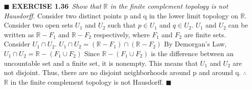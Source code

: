 \documentclass[12pt]{article}
\begin{document}
	\newline \(\blacksquare\)
	\newpage
	\noindent
	\textbf{EXERCISE 1.36}\ \textit{Show that} \(\mathbb{R}\)
	\textit{in the finite complement topology is not Hausdorff.}
	\newline \newline
	Consider two distinct points p and q in the lower limit topology on \(\mathbb{R}\). \newline \newline
	Consider two open sets \(U_1\) and \(U_2\) such that \(p \in U_1\) and \(q \in U_2\). \newline
	\(U_1\) and \(U_2\) can be written as \(\mathbb{R} - F_1\) and \(\mathbb{R} - F_2\) respectively, where \(F_1\) and \(F_2\) are finite sets.
	\newline
	\newline
	Consider \(U_1 \cap U_2\).
	\newline
	\(U_1 \cap U_2 = (\mathbb{R} - F_1) \cap (\mathbb{R}- F_2)\)
	\newline
	By Demorgan's Law, \newline
	\(U_1 \cap U_2 = \mathbb{R} - (F_1 \cup F_2)\)
	\newline \newline
	Since \(\mathbb{R} - (F_1 \cup F_2)\) is the difference between an uncountable set and a finite set, it is nonempty.
	\newline
	This means that \(U_1\) and \(U_2\) are not disjoint.
	\newline
	Thus, there are no disjoint neighborhoods around p and around q. \newline \newline
	\(\therefore\) \(\mathbb{R}\) in the finite complement topology is not Hausdorff.
	\newline \(\blacksquare\)
\end{document}
